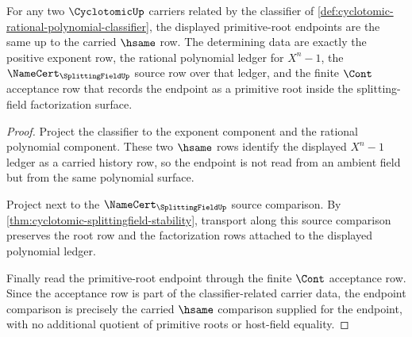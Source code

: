 \begin{theorem}
\label{thm:cyclotomic-primitive-root-endpoint-determinacy}
For any two $\CyclotomicUp$ carriers related by the classifier of \autoref{def:cyclotomic-rational-polynomial-classifier}, the displayed primitive-root endpoints are the same up to the carried $\hsame$ row. The determining data are exactly the positive exponent row, the rational polynomial ledger for $X^n-1$, the $\NameCert_{\SplittingFieldUp}$ source row over that ledger, and the finite $\Cont$ acceptance row that records the endpoint as a primitive root inside the splitting-field factorization surface.
\end{theorem}
\begin{proof}
Project the classifier to the exponent component and the rational polynomial component. These two $\hsame$ rows identify the displayed $X^n-1$ ledger as a carried history row, so the endpoint is not read from an ambient field but from the same polynomial surface.

Project next to the $\NameCert_{\SplittingFieldUp}$ source comparison. By \autoref{thm:cyclotomic-splittingfield-stability}, transport along this source comparison preserves the root row and the factorization rows attached to the displayed polynomial ledger.

Finally read the primitive-root endpoint through the finite $\Cont$ acceptance row. Since the acceptance row is part of the classifier-related carrier data, the endpoint comparison is precisely the carried $\hsame$ comparison supplied for the endpoint, with no additional quotient of primitive roots or host-field equality.
\end{proof}

